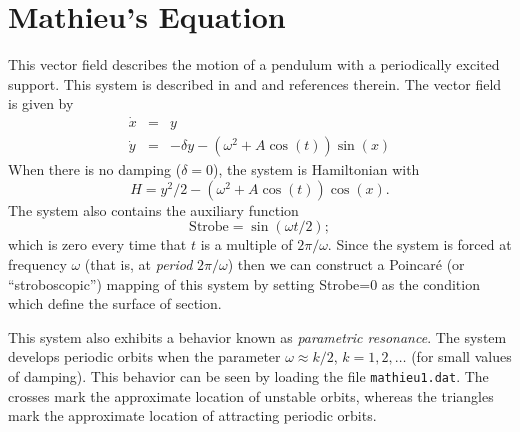\section{Mathieu's Equation}

        This vector field describes the motion of a pendulum with a
periodically excited support.  This system is described in
\cite[p. 29-32]{GH} and \cite[\S 25]{arnold} and references therein.  The vector field
is given by
\begin{eqnarray*}
	\dot{x} &=& y \\
	\dot{y}& =& -\delta y-(\omega^2+A \cos(t)) \sin(x)
\end{eqnarray*}
When there is no damping ($\delta=0$), the system is Hamiltonian with 
\[	H = y^2/2 -(\omega^2 +A \cos(t)) \cos(x).
\]
The system also contains the auxiliary function 
\[
	\mbox{Strobe} = \sin( \omega t/2 );
\]
which is zero every time that $t$ is a multiple of $2 \pi/\omega$.
Since the system is forced at frequency $\omega$ (that is, at {\em
period} $2 \pi/\omega$) then we can construct a Poincar\'e (or
``stroboscopic'') mapping of this system by setting Strobe=0 as the
condition which define the surface of section.

This system also exhibits a behavior known as {\em parametric
resonance}.  The system develops periodic orbits when the parameter
$\omega \approx k/2$, $k=1,2,\ldots$ (for small values of damping).
This behavior can be seen by loading the file {\tt mathieu1.dat}.  The
crosses mark the approximate location of unstable orbits, whereas the
triangles mark the approximate location of attracting periodic orbits.
